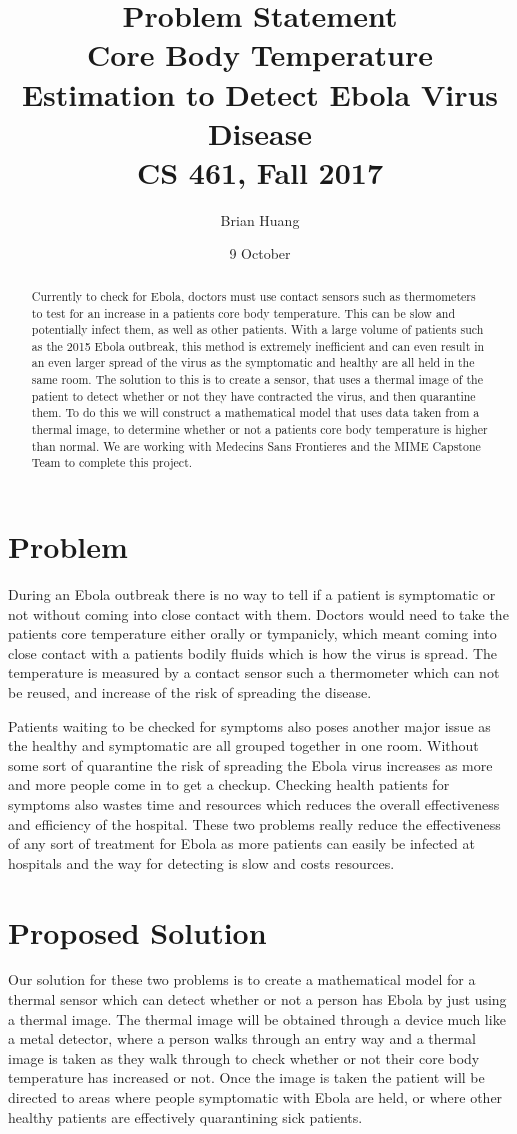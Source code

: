 \documentclass{article}
\title{%
  Problem Statement \\
  \large Core Body Temperature Estimation to Detect Ebola Virus Disease \\
  \large CS 461, Fall 2017\\
    }
\author{Brian Huang}
\date{9 October}
\begin{document}
\maketitle
\begin{abstract}
Currently to check for Ebola, doctors must use contact sensors such as thermometers to test for an increase in a patients core body temperature. This can be slow and potentially infect them, as well as other patients. With a large volume of patients such as the 2015 Ebola outbreak, this method is extremely inefficient and can even result in an even larger spread of the virus as the symptomatic and healthy are all held in the same room. The solution to this is to create a sensor, that uses a thermal image of the patient to detect whether or not they have contracted the virus, and then quarantine them. To do this we will construct a mathematical model that uses data taken from a thermal image, to determine whether or not a patients core body temperature is higher than normal. We are working with Medecins Sans Frontieres and the MIME Capstone Team to complete this project.
\end{abstract}
\newpage
\section{Problem}
During an Ebola outbreak there is no way to tell if a patient is symptomatic or not without coming into close contact with them. Doctors would need to take the patients core temperature either orally or tympanicly, which meant coming into close contact with a patients bodily fluids which is how the virus is spread. The temperature is measured by a contact sensor such a thermometer which can not be reused, and increase of the risk of spreading the disease.

Patients waiting to be checked for symptoms also poses another major issue as the healthy and symptomatic are all grouped together in one room. Without some sort of quarantine the risk of spreading the Ebola virus increases as more and more people come in to get a checkup. Checking health patients for symptoms also wastes time and resources which reduces the overall effectiveness and efficiency of the hospital. These two problems really reduce the effectiveness of any sort of treatment for Ebola as more patients can easily be infected at hospitals and the way for detecting is slow and costs resources.
\section{Proposed Solution}
Our solution for these two problems is to create a mathematical model for a thermal sensor which can detect whether or not a person has Ebola by just using a thermal image. The thermal image will be obtained through a device much like a metal detector, where a person walks through an entry way and a thermal image is taken as they walk through to check whether or not their core body temperature has increased or not. Once the image is taken the patient will be directed to areas where people symptomatic with Ebola are held, or where other healthy patients are effectively quarantining sick patients.
\end{document}

